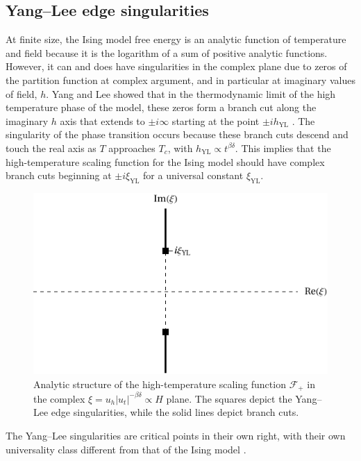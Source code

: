 \documentclass[
  aps,
  pre,
  reprint,
  longbibliography,
  floatfix
]{revtex4-2}
\begin{document}
\subsection{Yang--Lee edge singularities}

At finite size, the Ising model free energy is an analytic function of
temperature and field because it is the logarithm of a sum of positive analytic
functions. However, it can and does have singularities in the complex plane due
to zeros of the partition function at complex argument, and in particular at
imaginary values of field, $h$. Yang and Lee showed that in the thermodynamic
limit of the high temperature phase of the model, these zeros form a branch cut
along the imaginary $h$ axis that extends to $\pm i\infty$ starting at the
point $\pm ih_{\mathrm{YL}}$ \cite{Yang_1952_Statistical, Lee_1952_Statistical}.
The singularity of the phase transition occurs because these branch cuts
descend and touch the real axis as $T$ approaches $T_c$, with
$h_{\mathrm{YL}}\propto t^{\beta\delta}$. This implies that the
high-temperature scaling function for the Ising model should have complex
branch cuts beginning at $\pm i\xi_{\mathrm{YL}}$ for a universal constant
$\xi_{\mathrm{YL}}$.

\begin{figure}
  \includegraphics{figs/F_higher_singularities.pdf}
  \caption{
    Analytic structure of the high-temperature scaling function $\mathcal F_+$
    in the complex $\xi=u_h|u_t|^{-\beta\delta}\propto H$ plane. The squares
    depict the Yang--Lee edge singularities, while the solid lines depict
    branch cuts.
  } \label{fig:higher.singularities}
\end{figure}

The Yang--Lee singularities are critical points in their own right, with their own universality class different from that of the Ising model \cite{Fisher_1978_Yang-Lee}.
\end{document}
